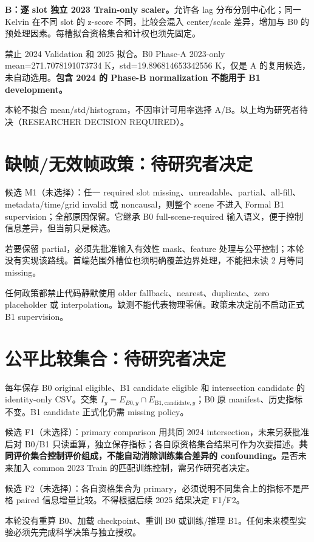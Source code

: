 \documentclass[UTF8,11pt,a4paper,fontset=windows]{ctexart}
\begin{document}
\textbf{B：逐 slot 独立 2023 Train-only scaler。}允许各 lag 分布分别中心化；同一 Kelvin 在不同 slot 的 z-score 不同，比较会混入 center/scale 差异，增加与 B0 的预处理因素。每槽拟合资格集合和计权也须先固定。

禁止 2024 Validation 和 2025 拟合。B0 Phase-A 2023-only mean=271.7078191073734 K，std=19.896814653342556 K，仅是 A 的复用候选，未自动选用。\textbf{包含 2024 的 Phase-B normalization 不能用于 B1 development。}

本轮不拟合 mean/std/histogram，不因审计可用率选择 A/B。以上均为研究者待决（RESEARCHER DECISION REQUIRED）。
\newpage
\section*{缺帧/无效帧政策：待研究者决定}
候选 M1（未选择）：任一 required slot missing、unreadable、partial、all-fill、metadata/time/grid invalid 或 noncausal，则整个 scene 不进入 Formal B1 supervision；全部原因保留。它继承 B0 full-scene-required 输入语义，便于控制信息差异，但当前只是候选。

若要保留 partial，必须先批准输入有效性 mask、feature 处理与公平控制；本轮没有实现该路线。首端范围外槽位也须明确覆盖边界处理，不能把未读 2 月等同 missing。

任何政策都禁止代码静默使用 older fallback、nearest、duplicate、zero placeholder 或 interpolation。缺测不能代表物理零值。政策未决定前不启动正式 B1 supervision。

\section*{公平比较集合：待研究者决定}
每年保存 B0 original eligible、B1 candidate eligible 和 intersection candidate 的 identity-only CSV。交集 $I_y=E_{B0,y}\cap E_{\mathrm{B1,candidate},y}$；B0 原 manifest、历史指标不变。B1 candidate 正式化仍需 missing policy。

候选 F1（未选择）：primary comparison 用共同 2024 intersection，未来另获批准后对 B0/B1 只读重算，独立保存指标；各自原资格集合结果可作为次要描述。\textbf{共同评价集合控制评价组成，不能自动消除训练集合差异的 confounding。}是否未来加入 common 2023 Train 的匹配训练控制，需另作研究者决定。

候选 F2（未选择）：各自资格集合为 primary，必须说明不同集合上的指标不是严格 paired 信息增量比较。不得根据后续 2025 结果决定 F1/F2。

本轮没有重算 B0、加载 checkpoint、重训 B0 或训练/推理 B1。任何未来模型实验必须先完成科学决策与独立授权。
\end{document}
